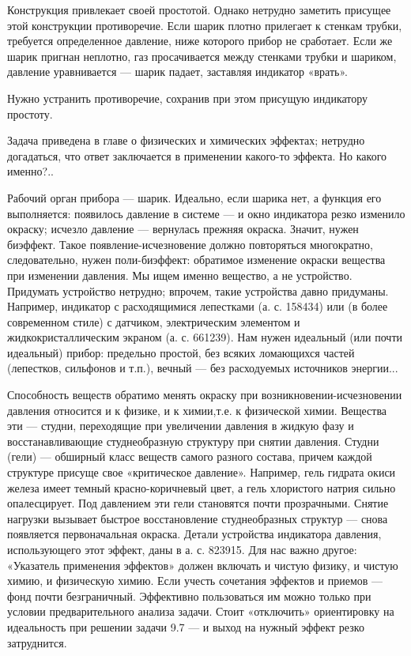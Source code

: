 Конструкция  привлекает  своей  простотой.  Однако  нетрудно  заметить
присущее этой конструкции противоречие.  Если шарик плотно прилегает к
стенкам трубки, требуется определенное  давление, ниже которого прибор
не сработает. Если же шарик  пригнан неплотно, газ просачивается между
стенками  трубки  и шариком,  давление  уравнивается  — шарик  падает,
заставляя индикатор «врать».

Нужно устранить  противоречие, сохранив  при этом  присущую индикатору
простоту.

Задача приведена в главе о  физических и химических эффектах; нетрудно
догадаться, что  ответ заключается в применении  какого-то эффекта. Но
какого именно?..

Рабочий орган  прибора — шарик.  Идеально, если шарика нет,  а функция
его  выполняется: появилось  давление в  системе —  и окно  индикатора
резко  изменило   окраску;  исчезло   давление  —   вернулась  прежняя
окраска. Значит,  нужен биэффект. Такое  появление-исчезновение должно
повторяться многократно, следовательно, нужен поли-биэффект: обратимое
изменение  окраски вещества  при  изменении давления.  Мы ищем  именно
вещество,  а не  устройство. Придумать  устройство нетрудно;  впрочем,
такие устройства давно придуманы.  Например, индикатор с расходящимися
лепестками (а. с. 158434) или  (в более современном стиле) с датчиком,
электрическим элементом и жидкокристаллическим экраном (а. с. 661239).
Нам нужен  идеальный (или почти идеальный)  прибор: предельно простой,
без всяких ломающихся  частей (лепестков, сильфонов и  т.п.), вечный —
без расходуемых источников энергии...

Способность      веществ     обратимо      менять     окраску      при
возникновении-исчезновении  давления   относится  и  к  физике,   и  к
химии,т.е. к физической химии. Вещества  эти — студни, переходящие при
увеличении давления  в жидкую фазу и  восстанавливающие студнеобразную
структуру  при  снятии  давления.   Студни  (гели)  —  обширный  класс
веществ  самого  разного  состава,  причем  каждой  структуре  присуще
свое  «критическое  давление».  Например, гель  гидрата  окиси  железа
имеет темный  красно-коричневый цвет, а гель  хлористого натрия сильно
опалесцирует.  Под давлением  эти гели  становятся почти  прозрачными.
Снятие   нагрузки  вызывает   быстрое  восстановление   студнеобразных
структур — снова появляется  первоначальная окраска. Детали устройства
индикатора давления, использующего  этот эффект, даны в  а. с. 823915.
Для нас важно другое:  «Указатель применения эффектов» должен включать
и  чистую физику,  и чистую  химию,  и физическую  химию. Если  учесть
сочетания  эффектов и  приемов —  фонд почти  безграничный. Эффективно
пользоваться  им можно  только  при  условии предварительного  анализа
задачи.  Стоит «отключить»  ориентировку  на  идеальность при  решении
задачи 9.7 — и выход на нужный эффект резко затруднится.


